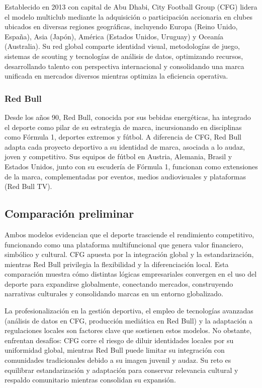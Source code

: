 \documentclass[12pt,a4paper]{article}
\begin{document}
Establecido en 2013 con capital de Abu Dhabi, City Football Group (CFG) lidera el modelo multiclub mediante la adquisición o participación accionaria en clubes ubicados en diversas regiones geográficas, incluyendo Europa (Reino Unido, España), Asia (Japón), América (Estados Unidos, Uruguay) y Oceanía (Australia).  Su red global comparte identidad visual, metodologías de juego, sistemas de scouting y tecnologías de análisis de datos, optimizando recursos, desarrollando talento con perspectiva internacional y consolidando una marca unificada en mercados diversos mientras optimiza la eficiencia operativa.

\subsubsection{Red Bull}

Desde los años 90, Red Bull, conocida por sus bebidas energéticas, ha integrado el deporte como pilar de su estrategia de marca, incursionando en disciplinas como Fórmula 1, deportes extremos y fútbol. A diferencia de CFG, Red Bull adapta cada proyecto deportivo a su identidad de marca, asociada a lo audaz, joven y competitivo. Sus equipos de fútbol en Austria, Alemania, Brasil y Estados Unidos, junto con su escudería de Fórmula 1, funcionan como extensiones de la marca, complementadas por eventos, medios audiovisuales y plataformas (Red Bull TV).

\subsection{Comparación preliminar}

Ambos modelos evidencian que el deporte trasciende el rendimiento competitivo, funcionando como una plataforma multifuncional que genera valor financiero, simbólico y cultural. CFG apuesta por la integración global y la estandarización, mientras Red Bull privilegia la flexibilidad y la diferenciación local. Esta comparación muestra cómo distintas lógicas empresariales convergen en el uso del deporte para expandirse globalmente, conectando mercados, construyendo narrativas culturales y consolidando marcas en un entorno globalizado.

La profesionalización en la gestión deportiva, el empleo de tecnologías avanzadas (análisis de datos en CFG, producción mediática en Red Bull) y la adaptación a regulaciones locales son factores clave que sostienen estos modelos. No obstante, enfrentan desafíos: CFG corre el riesgo de diluir identidades locales por su uniformidad global, mientras Red Bull puede limitar su integración con comunidades tradicionales debido a su imagen juvenil y audaz. Su reto es equilibrar estandarización y adaptación para conservar relevancia cultural y respaldo comunitario mientras consolidan su expansión.
\end{document}
